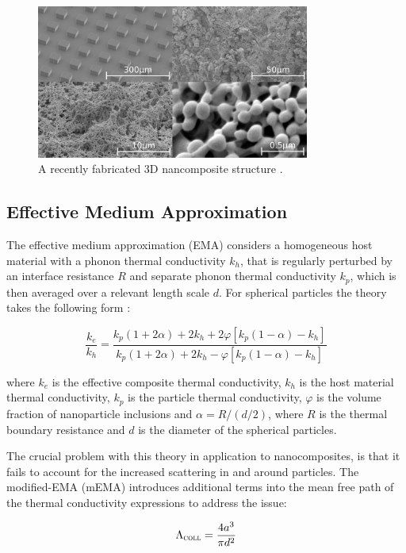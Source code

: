 \documentclass[12pt]{article}
\begin{document}
\begin{figure}
	\centering
	\includegraphics[width=0.8\textwidth]{stem-pillar-composites-edit.pdf}
	\caption{A recently fabricated 3D nancomposite structure \cite{minnich-review}.}
	\label{fig:nanopillars}
\end{figure}


\subsection{Effective Medium Approximation}
\label{sec:ema}
The effective medium approximation (EMA) considers a homogeneous host material with a phonon thermal conductivity $k_h$, that is regularly perturbed by an interface resistance $R$ and separate phonon thermal conductivity $k_p$, which is then averaged over a relevant length scale $d$. For spherical particles the theory takes the following form \cite{ema}:

\begin{equation}
\label{eq:ema}
	\frac{k_e}{k_h} = \frac{k_p (1 + 2\alpha) + 2k_h + 2	\varphi [k_p (1 - \alpha) - k_h]}{k_p (1 + 2\alpha) + 2k_h -	\varphi [k_p (1 - \alpha) - k_h]}
\end{equation}

where $k_e$ is the effective composite thermal conductivity, $k_h$ is the host material thermal conductivity, $k_p$ is the particle thermal conductivity, $\varphi$  is the volume fraction of nanoparticle inclusions and $\alpha = R / (d / 2)$, where $R$ is the thermal boundary resistance and $d$ is the diameter of the spherical particles.

The crucial problem with this theory in application to nanocomposites, is that it fails to account for the increased scattering in and around particles. The modified-EMA (mEMA) \cite{mema} introduces additional terms into the mean free path of the thermal conductivity expressions to address the issue:

\begin{equation}
\label{eq:mema}
	\Lambda_{\textsc{coll}} = \frac {4a^3}{\pi d^2}
\end{equation}
\end{document}

